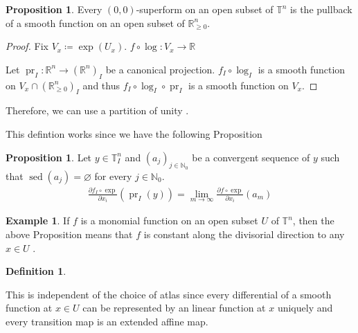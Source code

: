 \documentclass[a4paper,dvipdfmx,reqno,12pt]{amsart}
\theoremstyle{definition}
\newtheorem{Def}[Thm]{Definition}
\newtheorem{Eg}[Thm]{Example}
\newtheorem{Prop}[Thm]{Proposition}
\newcommand{\deq}{\coloneqq}
\newcommand{\emp}{\varnothing}%
\newcommand{\R}{\mathbb{R}}%
\newcommand{\N}{\mathbb{N}_{0}}%
\newcommand{\mb}[1]{\mathbb{#1}}%
\newcommand{\opn}[1]{\operatorname{#1}}
\numberwithin{equation}{section}
\begin{document}
\begin{Prop}
Every $(0,0)$-superform on an open subset of $\mb{T}^{n}$ is the pullback
of a smooth function on an open subset of $\R_{\geq 0}^{n}$.
\end{Prop}

\begin{proof}
Fix $V_x\deq \opn{exp}(U_x)$. $f\circ \opn{log}\colon V_x \to \R$

Let $\opn{pr}_I\colon \R^{n} \to (\R^{n})_I$ be 
a canonical projection. $f_I \circ \opn{log}_I$ is a smooth 
function on $V_x \cap (\R_{\geq 0}^{n})_I$ and thus
$f_I \circ \opn{log}_I \circ \opn{pr}_I$ is a smooth function on 
$V_x$.
\end{proof}
Therefore, we can use a partition of unity \cite[Lemma 2.7]{MR3903579}.

This defintion works since we have the following Proposition
\begin{Prop}
Let $y\in \mb{T}_I^{n}$ and
$(a_j)_{j\in \N}$ be a convergent sequence of $y$ such that 
$\opn{sed}(a_j)=\emp$ for every $j\in \N$.
\begin{align}
\frac{\partial f_I\circ \opn{exp}}{\partial x_i}(\opn{pr}_I(y))
=\lim_{m\to \infty}\frac{\partial f\circ \opn{exp}}{\partial x_i}(a_m)
\end{align}

\end{Prop}

\begin{Eg}
If $f$ is a monomial function on an open subset $U$ of $\mb{T}^{n}$, then the above Proposition means that
$f$ is constant along the divisorial direction to any $x\in U$
\cite[Definition 3.2]{jellLefschetzTheoremTropical2018a}.
\end{Eg}
\begin{Def}

\end{Def}
This is independent of the choice of atlas since every differential 
of a smooth function at $x\in U$ can be represented by an
linear function at $x$ uniquely and every transition map is an 
extended affine map.




\printindex
\end{document}
